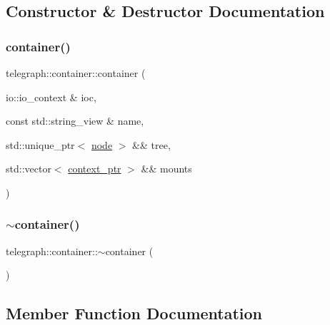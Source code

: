 \subsection{Constructor \& Destructor Documentation}
\mbox{\label{classtelegraph_1_1container_a1bdc819f7250ab657c2b512994b2a4d9}} 
\subsubsection{\texorpdfstring{container()}{container()}}
{\footnotesize\ttfamily telegraph\+::container\+::container (\begin{DoxyParamCaption}\item[{io\+::io\+\_\+context \&}]{ioc,  }\item[{const std\+::string\+\_\+view \&}]{name,  }\item[{std\+::unique\+\_\+ptr$<$ \hyperlink{classtelegraph_1_1node}{node} $>$ \&\&}]{tree,  }\item[{std\+::vector$<$ \hyperlink{namespacetelegraph_a332e681f0d44a1308cf3a013a9dd140f}{context\+\_\+ptr} $>$ \&\&}]{mounts }\end{DoxyParamCaption})}

\mbox{\label{classtelegraph_1_1container_a8f6afe0f414694ed550d654e722e4ae4}} 
\subsubsection{\texorpdfstring{$\sim$container()}{~container()}}
{\footnotesize\ttfamily telegraph\+::container\+::$\sim$container (\begin{DoxyParamCaption}{ }\end{DoxyParamCaption})}



\subsection{Member Function Documentation}
\mbox{\label{classtelegraph_1_1container_a499649499d61f07dbe44bbec933414a0}} 
